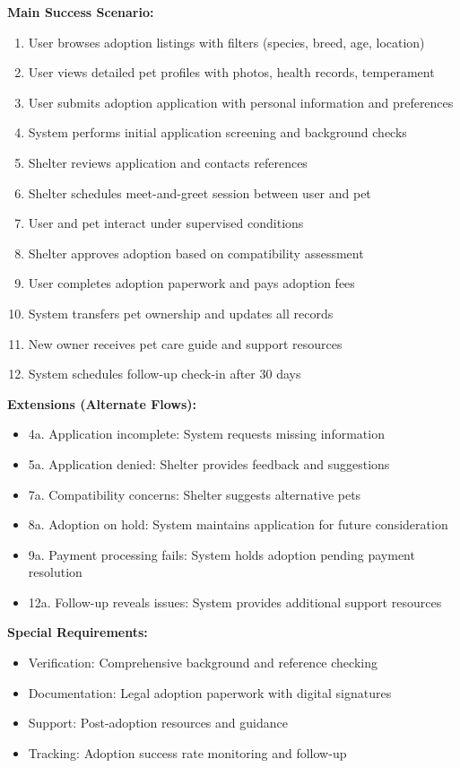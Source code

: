 \textbf{Main Success Scenario:}
\begin{enumerate}
    \item User browses adoption listings with filters (species, breed, age, location)
    \item User views detailed pet profiles with photos, health records, temperament
    \item User submits adoption application with personal information and preferences
    \item System performs initial application screening and background checks
    \item Shelter reviews application and contacts references
    \item Shelter schedules meet-and-greet session between user and pet
    \item User and pet interact under supervised conditions
    \item Shelter approves adoption based on compatibility assessment
    \item User completes adoption paperwork and pays adoption fees
    \item System transfers pet ownership and updates all records
    \item New owner receives pet care guide and support resources
    \item System schedules follow-up check-in after 30 days
\end{enumerate}

\textbf{Extensions (Alternate Flows):}
\begin{itemize}
    \item 4a. Application incomplete: System requests missing information
    \item 5a. Application denied: Shelter provides feedback and suggestions
    \item 7a. Compatibility concerns: Shelter suggests alternative pets
    \item 8a. Adoption on hold: System maintains application for future consideration
    \item 9a. Payment processing fails: System holds adoption pending payment resolution
    \item 12a. Follow-up reveals issues: System provides additional support resources
\end{itemize}

\textbf{Special Requirements:}
\begin{itemize}
    \item Verification: Comprehensive background and reference checking
    \item Documentation: Legal adoption paperwork with digital signatures
    \item Support: Post-adoption resources and guidance
    \item Tracking: Adoption success rate monitoring and follow-up
\end{itemize}

